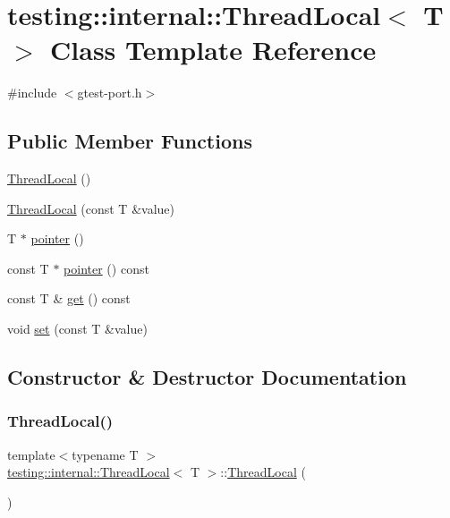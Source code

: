 \hypertarget{classtesting_1_1internal_1_1ThreadLocal}{}\section{testing\+::internal\+::Thread\+Local$<$ T $>$ Class Template Reference}
\label{classtesting_1_1internal_1_1ThreadLocal}


{\ttfamily \#include $<$gtest-\/port.\+h$>$}

\subsection*{Public Member Functions}
\begin{DoxyCompactItemize}
\item 
\mbox{\hyperlink{classtesting_1_1internal_1_1ThreadLocal_a106f3a3ad15d08f95f9887105d2a1af5}{Thread\+Local}} ()
\item 
\mbox{\hyperlink{classtesting_1_1internal_1_1ThreadLocal_a85610bdfdbc93a4c56215e0aad7da870}{Thread\+Local}} (const T \&value)
\item 
T $\ast$ \mbox{\hyperlink{classtesting_1_1internal_1_1ThreadLocal_a882f57fed4b074de83693c0c0fe62858}{pointer}} ()
\item 
const T $\ast$ \mbox{\hyperlink{classtesting_1_1internal_1_1ThreadLocal_a57e45bb60e3cd94abb04fa449e9f0367}{pointer}} () const
\item 
const T \& \mbox{\hyperlink{classtesting_1_1internal_1_1ThreadLocal_ac56aeb97991824979bf192c63d1466f8}{get}} () const
\item 
void \mbox{\hyperlink{classtesting_1_1internal_1_1ThreadLocal_ab5ebc7ba07426cef7167afa2a7707eb4}{set}} (const T \&value)
\end{DoxyCompactItemize}


\subsection{Constructor \& Destructor Documentation}
\mbox{\label{classtesting_1_1internal_1_1ThreadLocal_a106f3a3ad15d08f95f9887105d2a1af5}} 
\subsubsection{\texorpdfstring{ThreadLocal()}{ThreadLocal()}\hspace{0.1cm}{\footnotesize\ttfamily [1/2]}}
{\footnotesize\ttfamily template$<$typename T $>$ \\
\mbox{\hyperlink{classtesting_1_1internal_1_1ThreadLocal}{testing\+::internal\+::\+Thread\+Local}}$<$ T $>$\+::\mbox{\hyperlink{classtesting_1_1internal_1_1ThreadLocal}{Thread\+Local}} (\begin{DoxyParamCaption}{ }\end{DoxyParamCaption})\hspace{0.3cm}{\ttfamily [inline]}}

